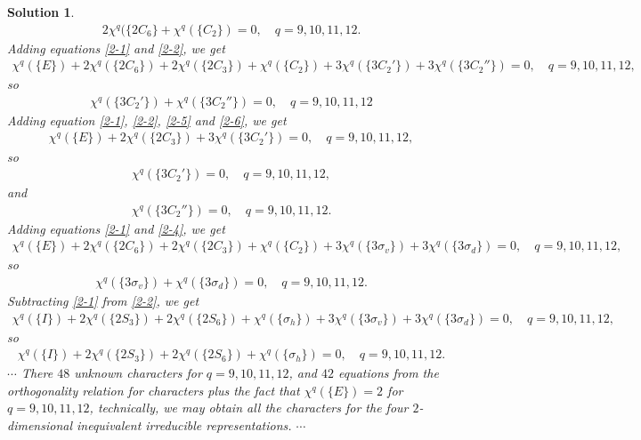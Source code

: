 \documentclass[UTF8,10pt,a4paper]{article}
\theoremstyle{Problem}
\theoremstyle{Solution}
\newtheorem*{sol}{Solution}
\begin{document}
\begin{sol}
\begin{align}
        2\chi^q(\{2C_6\}+\chi^q(\{C_2\})=0,\quad q=9,10,11,12.
    \end{align}
    Adding equations \eqref{2-1} and \eqref{2-2}, we get
    \begin{align}
        \chi^q(\{E\})+2\chi^q(\{2C_6\})+2\chi^q(\{2C_3\})+\chi^q(\{C_2\})+3\chi^q(\{3C_2'\})+3\chi^q(\{3C_2''\})=0,\quad q=9,10,11,12,
    \end{align}
    so
    \begin{align}
        \chi^q(\{3C_2'\})+\chi^q(\{3C_2''\})=0,\quad q=9,10,11,12
    \end{align}
    Adding equation \eqref{2-1}, \eqref{2-2}, \eqref{2-5} and \eqref{2-6}, we get
    \begin{align}
        \chi^q(\{E\})+2\chi^q(\{2C_3\})+3\chi^q(\{3C_2'\})=0,\quad q=9,10,11,12,
    \end{align}
    so
    \begin{align}
        \chi^q(\{3C_2'\})=0,\quad q=9,10,11,12,
    \end{align}
    and
    \begin{align}
        \chi^q(\{3C_2''\})=0,\quad q=9,10,11,12.
    \end{align}
    Adding equations \eqref{2-1} and \eqref{2-4}, we get
    \begin{align}
        \chi^q(\{E\})+2\chi^q(\{2C_6\})+2\chi^q(\{2C_3\})+\chi^q(\{C_2\})+3\chi^q(\{3\sigma_v\})+3\chi^q(\{3\sigma_d\})=0,\quad q=9,10,11,12,
    \end{align}
    so
    \begin{align}
        \chi^q(\{3\sigma_v\})+\chi^q(\{3\sigma_d\})=0,\quad q=9,10,11,12.
    \end{align}
    Subtracting \eqref{2-1} from \eqref{2-2}, we get
    \begin{align}
        \chi^q(\{I\})+2\chi^q(\{2S_3\})+2\chi^q(\{2S_6\})+\chi^q(\{\sigma_h\})+3\chi^q(\{3\sigma_v\})+3\chi^q(\{3\sigma_d\})=0,\quad q=9,10,11,12,
    \end{align}
    so
    \begin{align}
        \chi^q(\{I\})+2\chi^q(\{2S_3\})+2\chi^q(\{2S_6\})+\chi^q(\{\sigma_h\})=0,\quad q=9,10,11,12.
    \end{align}
    $\cdots$ There $48$ unknown characters for $q=9,10,11,12$, and $42$ equations from the orthogonality relation for characters plus the fact that $\chi^q(\{E\})=2$ for $q=9,10,11,12$, technically, we may obtain all the characters for the four $2$-dimensional inequivalent irreducible representations. $\cdots$\\

\end{sol}
\end{document}
